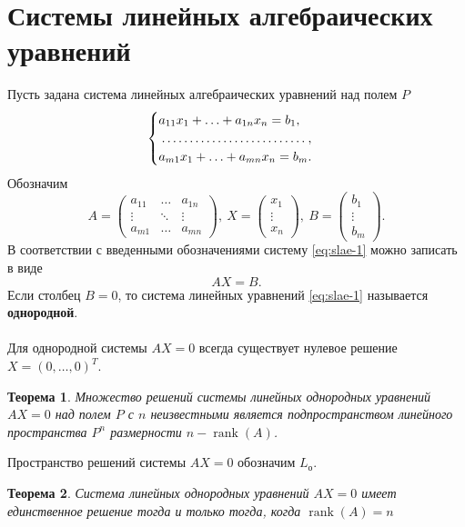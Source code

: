 \documentclass[a4paper, 12pt]{report}
\numberwithin{equation}{section}
\newcommand{\rank}{\operatorname{rank}}
\newtheorem*{theorem}{Теорема}
\begin{document}
	\section{Системы линейных алгебраических уравнений}
	Пусть задана система линейных алгебраических уравнений над полем $P$
	\begin{equation}
		\label{eq:slae-1}
		\begin{cases}
			a_{11}x_1+ \ldots +a_{1n}x_n=b_1, \\
			\dotfill,\\
			a_{m1}x_1+ \ldots + a_{mn}x_n=b_m.
		\end{cases}
	\end{equation}
	Обозначим
	\begin{equation*}
		A = \begin{pmatrix}
			a_{11} & \ldots & a_{1n}\\
			\vdots & \ddots & \vdots \\
			a_{m1} & \ldots & a_{mn}
		\end{pmatrix},\ X = \begin{pmatrix}
			x_1 \\ \vdots \\ x_n
		\end{pmatrix},\ B = \begin{pmatrix}
			b_1 \\ \vdots \\ b_m
		\end{pmatrix}.
	\end{equation*}
	В соответствии с введенными обозначениями систему \eqref{eq:slae-1} можно записать в виде
	\begin{equation}
		AX = B.
	\end{equation}
	{Если столбец $B=0$, то система линейных уравнений \eqref{eq:slae-1} называется \textbf{однородной}.}
	\\\\
	Для однородной системы $AX = 0$ всегда существует нулевое решение $X = (0,\ldots, 0)^T$.
	\begin{theorem}
		Множество решений системы линейных однородных уравнений $AX = 0$ над полем $P$ с $n$ неизвестными является подпространством линейного пространства $P^n$ размерности $n-\rank(A)$.
	\end{theorem}
	\noindent
	Пространство решений системы $AX = 0$ обозначим $L_\text{о}$.
	\begin{theorem}
		Система линейных однородных уравнений $AX = 0$ имеет единственное решение тогда и только тогда, когда $\rank(A) = n$
	\end{theorem}
\end{document}
